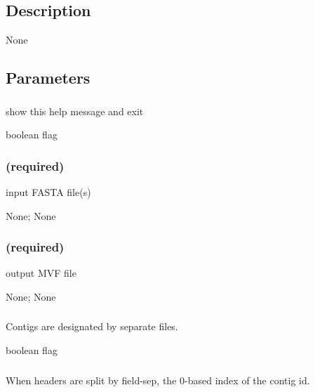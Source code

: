 \documentclass[letterpaper,11pt,english]{sphinxmanual}
\begin{document}
\subsection{Description}
\label{\detokenize{prog_desc:id1}}
None


\subsection{Parameters}
\label{\detokenize{prog_desc:id2}}

\subsubsection{}
\label{\detokenize{prog_desc:id3}}
 show this help message and exit

 boolean flag


\subsubsection{ (required)}
\label{\detokenize{prog_desc:fasta-required}}
 input FASTA file(s)

 None;  None


\subsubsection{ (required)}
\label{\detokenize{prog_desc:id4}}
 output MVF file

 None;  None


\subsubsection{}
\label{\detokenize{prog_desc:contig-by-file-contigbyfile}}
 Contigs are designated by separate files.

 boolean flag


\subsubsection{}
\label{\detokenize{prog_desc:contig-field-contigfield}}
 When headers are split by \textendash{}field-sep, the 0-based index of the contig id.
\end{document}
